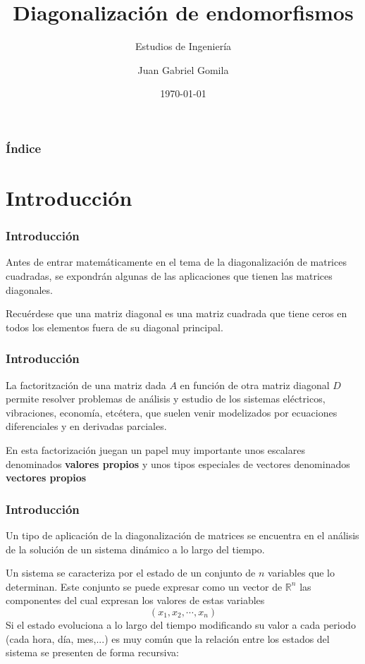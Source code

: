 \documentclass{beamer}
\title[Tema 5 - Diagonalizaci\'on de endomorfismos]{Diagonalizaci\'on de endomorfismos}
\subtitle{Estudios de Ingenier\'ia}
\author[https://frogames.es]{
Juan Gabriel Gomila%
}
\institute[Frogames]{
 Frogames
   \and
  \texttt{https://frogames.es}
}
\date{\today}
\begin{document}
 

\frame{\titlepage}

\begin{frame}
  \frametitle{\'Indice}
  \tableofcontents
\end{frame}

\section{Introducci\'on}

\begin{frame}
\frametitle{Introducci\'on}
Antes de entrar matem\'aticamente en el tema de la diagonalizaci\'on de matrices cuadradas, se expondr\'an algunas de las aplicaciones que tienen las matrices diagonales.


Recu\'erdese que una matriz diagonal es una matriz cuadrada que tiene ceros en todos los elementos fuera de su diagonal principal.
\end{frame}

\begin{frame}
\frametitle{Introducci\'on}
La factoritzaci\'on de una matriz dada $A$ en funci\'on de otra matriz diagonal $D$ permite resolver problemas de an\'alisis y estudio de los sistemas el\'ectricos, vibraciones, econom\'ia, etc\'etera, que suelen venir modelizados por ecuaciones diferenciales y en derivadas parciales.


En esta factorizaci\'on juegan un papel muy importante unos escalares denominados \textbf{valores propios} y unos tipos especiales de vectores denominados \textbf{vectores propios}
\end{frame}

\begin{frame}
\frametitle{Introducci\'on}
Un tipo de aplicaci\'on de la diagonalizaci\'on de matrices se encuentra en el an\'alisis de la soluci\'on de un sistema din\'amico a lo largo del tiempo.

Un sistema se caracteriza por el estado de un conjunto de $n$ variables que lo determinan. Este conjunto se puede expresar como un vector de $\mathbb R^n$ las componentes del cual expresan los valores de estas variables
\[(x_1,x_2,\cdots, x_n)\]
Si el estado evoluciona a lo largo del tiempo modificando su valor a cada periodo (cada hora, d\'ia, mes,...) es muy com\'un que la relaci\'on entre los estados del sistema se presenten de forma recursiva:
\end{frame}
 
 
 
\end{document}

